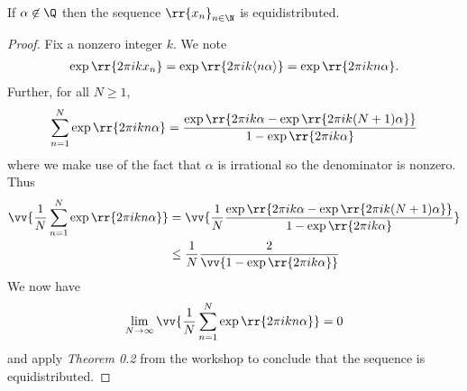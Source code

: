 \documentclass{article}
\begin{document}
\begin{claim*}[4b]
  If $\alpha\not\in\Q$ then the sequence $\rr{x_n}_{n\in\N}$ is equidistributed.
  \begin{proof}
    Fix a nonzero integer $k$. We note
    \begin{align*}
      \exp\rr{2\pi ikx_n}
      = \exp\rr{2\pi ik\langle n\alpha\rangle}
      = \exp\rr{2\pi ikn\alpha}.
    \end{align*}
    Further, for all $N\geq 1$,
    \begin{align*}
      \sum_{n=1}^{N} \exp\rr{2\pi i kn\alpha}
      = \frac{\exp\rr{2\pi ik\alpha-\exp\rr{2\pi ik(N+1)\alpha}}}{1-\exp\rr{2\pi i k\alpha}}
    \end{align*}
    where we make use of the fact that $\alpha$ is irrational so the denominator is
    nonzero. Thus
    \begin{align*}
      \vv{\frac{1}{N}\sum_{n=1}^{N} \exp\rr{2\pi i kn\alpha}}
      &= \vv{\frac{1}{N}\frac{\exp\rr{2\pi ik\alpha-\exp\rr{2\pi ik(N+1)\alpha}}}{1-\exp\rr{2\pi i k\alpha}}}\\
      &\leq \frac{1}{N}\frac{2}{\vv{1-\exp\rr{2\pi ik\alpha}}}
    \end{align*}
    We now have
    \begin{align*}
      \lim_{N\to\infty}\vv{\frac{1}{N}\sum_{n=1}^{N} \exp\rr{2\pi i kn\alpha}} = 0
    \end{align*}
    and apply \emph{Theorem 0.2} from the workshop to conclude that the sequence
    is equidistributed.
  \end{proof}
\end{claim*}
\end{document}
